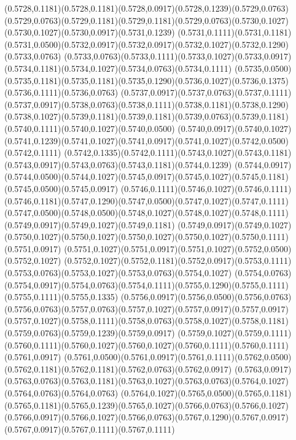 (0.5728,0.1181)(0.5728,0.1181)(0.5728,0.0917)(0.5728,0.1239)(0.5729,0.0763)
\PST@Solid(0.5729,0.0763)(0.5729,0.1181)(0.5729,0.1181)(0.5729,0.0763)(0.5730,0.1027)(0.5730,0.1027)(0.5730,0.0917)(0.5731,0.1239)
(0.5731,0.1111)(0.5731,0.1181)(0.5731,0.0500)(0.5732,0.0917)(0.5732,0.0917)(0.5732,0.1027)(0.5732,0.1290)(0.5733,0.0763)
(0.5733,0.0763)(0.5733,0.1111)(0.5733,0.1027)(0.5733,0.0917)(0.5734,0.1181)(0.5734,0.1027)(0.5734,0.0763)(0.5734,0.1111)
(0.5735,0.0500)(0.5735,0.1181)(0.5735,0.1181)(0.5735,0.1290)(0.5736,0.1027)(0.5736,0.1375)(0.5736,0.1111)(0.5736,0.0763)
(0.5737,0.0917)(0.5737,0.0763)(0.5737,0.1111)(0.5737,0.0917)(0.5738,0.0763)(0.5738,0.1111)(0.5738,0.1181)(0.5738,0.1290)
(0.5738,0.1027)(0.5739,0.1181)(0.5739,0.1181)(0.5739,0.0763)(0.5739,0.1181)(0.5740,0.1111)(0.5740,0.1027)(0.5740,0.0500)
(0.5740,0.0917)(0.5740,0.1027)(0.5741,0.1239)(0.5741,0.1027)(0.5741,0.0917)(0.5741,0.1027)(0.5742,0.0500)(0.5742,0.1111)
(0.5742,0.1335)(0.5742,0.1111)(0.5743,0.1027)(0.5743,0.1181)(0.5743,0.0917)(0.5743,0.0763)(0.5743,0.1181)(0.5744,0.1239)
(0.5744,0.0917)(0.5744,0.0500)(0.5744,0.1027)(0.5745,0.0917)(0.5745,0.1027)(0.5745,0.1181)(0.5745,0.0500)(0.5745,0.0917)
(0.5746,0.1111)(0.5746,0.1027)(0.5746,0.1111)(0.5746,0.1181)(0.5747,0.1290)(0.5747,0.0500)(0.5747,0.1027)(0.5747,0.1111)
(0.5747,0.0500)(0.5748,0.0500)(0.5748,0.1027)(0.5748,0.1027)(0.5748,0.1111)(0.5749,0.0917)(0.5749,0.1027)(0.5749,0.1181)
(0.5749,0.0917)(0.5749,0.1027)(0.5750,0.1027)(0.5750,0.1027)(0.5750,0.1027)(0.5750,0.1027)(0.5750,0.1111)(0.5751,0.0917)
(0.5751,0.1027)(0.5751,0.0917)(0.5751,0.1027)(0.5752,0.0500)(0.5752,0.1027)
\PST@Solid(0.5752,0.1027)(0.5752,0.1181)(0.5752,0.0917)(0.5753,0.1111)(0.5753,0.0763)(0.5753,0.1027)(0.5753,0.0763)(0.5754,0.1027)
(0.5754,0.0763)(0.5754,0.0917)(0.5754,0.0763)(0.5754,0.1111)(0.5755,0.1290)(0.5755,0.1111)(0.5755,0.1111)(0.5755,0.1335)
(0.5756,0.0917)(0.5756,0.0500)(0.5756,0.0763)(0.5756,0.0763)(0.5757,0.0763)(0.5757,0.1027)(0.5757,0.0917)(0.5757,0.0917)
(0.5757,0.1027)(0.5758,0.1111)(0.5758,0.0763)(0.5758,0.1027)(0.5758,0.1181)(0.5759,0.0763)(0.5759,0.1239)(0.5759,0.0917)
(0.5759,0.1027)(0.5759,0.1111)(0.5760,0.1111)(0.5760,0.1027)(0.5760,0.1027)(0.5760,0.1111)(0.5760,0.1111)(0.5761,0.0917)
(0.5761,0.0500)(0.5761,0.0917)(0.5761,0.1111)(0.5762,0.0500)(0.5762,0.1181)(0.5762,0.1181)(0.5762,0.0763)(0.5762,0.0917)
(0.5763,0.0917)(0.5763,0.0763)(0.5763,0.1181)(0.5763,0.1027)(0.5763,0.0763)(0.5764,0.1027)(0.5764,0.0763)(0.5764,0.0763)
(0.5764,0.1027)(0.5765,0.0500)(0.5765,0.1181)(0.5765,0.1181)(0.5765,0.1239)(0.5765,0.1027)(0.5766,0.0763)(0.5766,0.1027)
(0.5766,0.0917)(0.5766,0.1027)(0.5766,0.0763)(0.5767,0.1290)(0.5767,0.0917)(0.5767,0.0917)(0.5767,0.1111)(0.5767,0.1111)
